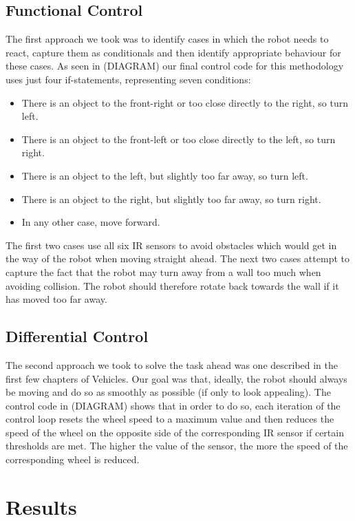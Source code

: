 \documentclass[paper=a4, fontsize=12pt]{scrartcl}	%
\numberwithin{equation}{section}		%
\numberwithin{figure}{section}			%
\numberwithin{table}{section}				%
\begin{document}
\subsection{Functional Control}
The first approach we took was to identify cases in which the robot needs to react, capture them as conditionals and then identify appropriate behaviour for these cases. As seen in (DIAGRAM) our final control code for this methodology uses just four if-statements, representing seven conditions:
\begin{itemize}
 \item There is an object to the front-right or too close directly to the right, so turn left.
 \item There is an object to the front-left or too close directly to the left, so turn right.
 \item There is an object to the left, but slightly too far away, so turn left.
 \item There is an object to the right, but slightly too far away, so turn right.
 \item In any other case, move forward.
\end{itemize}
The first two cases use all six IR sensors to avoid obstacles which would get in the way of the robot when moving straight ahead. The next two cases attempt to capture the fact that the robot may turn away from a wall too much when avoiding collision. The robot should therefore rotate back towards the wall if it has moved too far away.
\subsection{Differential Control}
The second approach we took to solve the task ahead was one described in the first few chapters of Vehicles. \cite{1} Our goal was that, ideally, the robot should always be moving and do so as smoothly as possible (if only to look appealing). The control code in (DIAGRAM) shows that in order to do so, each iteration of the control loop resets the wheel speed to a maximum value and then reduces the speed of the wheel on the opposite side of the corresponding IR sensor if certain thresholds are met. The higher the value of the sensor, the more the speed of the corresponding wheel is reduced.
\section{Results}
\end{document}
